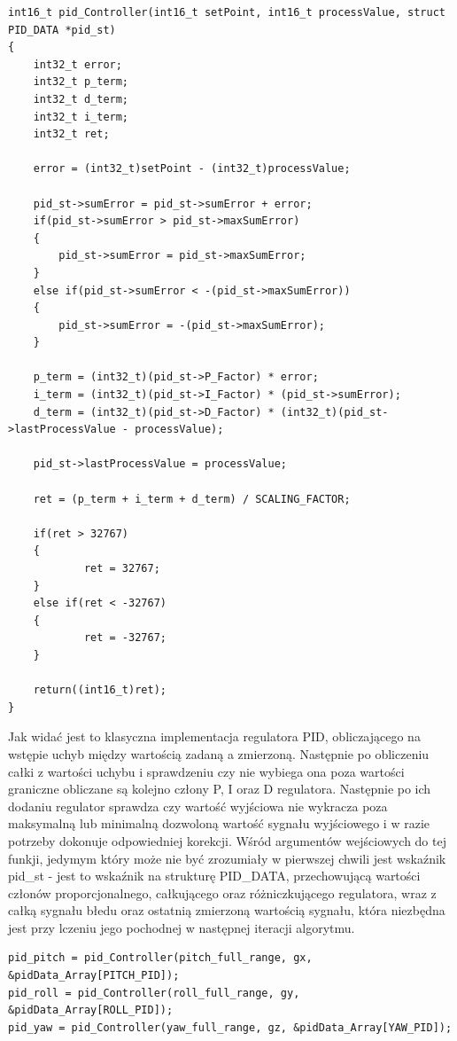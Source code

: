 \begin{lstlisting}
int16_t pid_Controller(int16_t setPoint, int16_t processValue, struct PID_DATA *pid_st)
{
	int32_t error;
	int32_t p_term;
	int32_t d_term;
	int32_t i_term; 
	int32_t ret;

  	error = (int32_t)setPoint - (int32_t)processValue;

	pid_st->sumError = pid_st->sumError + error;
	if(pid_st->sumError > pid_st->maxSumError)
	{
		pid_st->sumError = pid_st->maxSumError;
	}
	else if(pid_st->sumError < -(pid_st->maxSumError))
	{
		pid_st->sumError = -(pid_st->maxSumError);
	}
	
	p_term = (int32_t)(pid_st->P_Factor) * error;
  	i_term = (int32_t)(pid_st->I_Factor) * (pid_st->sumError);
  	d_term = (int32_t)(pid_st->D_Factor) * (int32_t)(pid_st->lastProcessValue - processValue);

  	pid_st->lastProcessValue = processValue;

  	ret = (p_term + i_term + d_term) / SCALING_FACTOR;
  
 	if(ret > 32767)
	{
    		ret = 32767;
  	}
  	else if(ret < -32767)
	{
    		ret = -32767;
  	}

  	return((int16_t)ret);
}
\end{lstlisting}

Jak widać jest to klasyczna implementacja regulatora PID, obliczającego na wstępie uchyb między wartością zadaną a zmierzoną. Następnie po obliczeniu całki z wartości uchybu i sprawdzeniu czy nie wybiega ona poza wartości graniczne obliczane są kolejno człony P, I oraz D regulatora. Następnie po ich dodaniu regulator sprawdza czy wartość wyjściowa nie wykracza poza maksymalną lub minimalną dozwoloną wartość sygnału wyjściowego i w razie potrzeby dokonuje odpowiedniej korekcji. Wśród argumentów wejściowych do tej funkji, jedymym który może nie być zrozumiały w pierwszej chwili jest wskaźnik pid\_st - jest to wskaźnik na strukturę PID\_DATA, przechowującą wartości członów proporcjonalnego, całkującego oraz różniczkującego regulatora, wraz z całką sygnału błedu oraz ostatnią zmierzoną wartością sygnału, która niezbędna jest przy lczeniu jego pochodnej w następnej iteracji algorytmu.

\begin{lstlisting}
pid_pitch = pid_Controller(pitch_full_range, gx, &pidData_Array[PITCH_PID]);
pid_roll = pid_Controller(roll_full_range, gy, &pidData_Array[ROLL_PID]);
pid_yaw = pid_Controller(yaw_full_range, gz, &pidData_Array[YAW_PID]);
\end{lstlisting}

